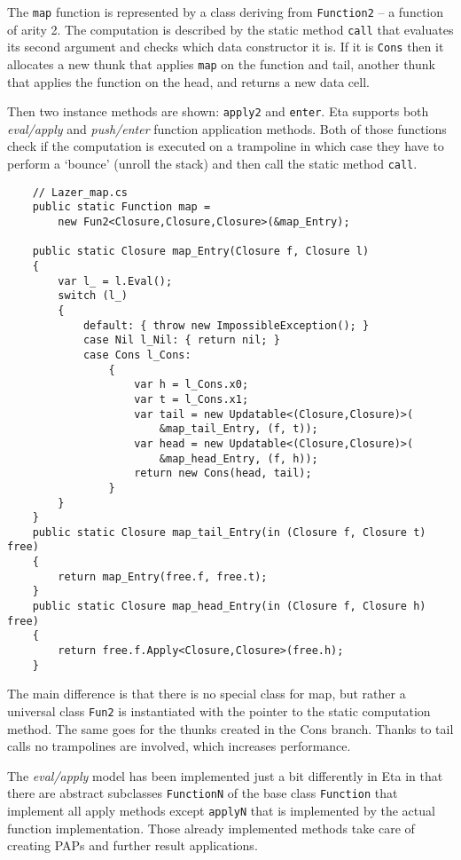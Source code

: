 \documentclass[en]{pracamgr}
\begin{document}
The \texttt{map} function is represented by a class deriving
from \texttt{Function2} -- a function of arity 2.
The computation is described by the static method \texttt{call}
that evaluates its second argument and checks which data
constructor it is. If it is \texttt{Cons} then it
allocates a new thunk that applies \texttt{map} on the function and tail, another thunk that applies the
function on the head, and returns a new data cell.

Then two instance methods are shown: \texttt{apply2} and \texttt{enter}.
Eta supports both \textit{eval/apply} and \textit{push/enter}
function application methods.
Both of those functions check if the computation is
executed on a trampoline in which case they have to
perform a `bounce' (unroll the stack)
and then call the static method \texttt{call}.

\begin{verbatim}
    // Lazer_map.cs
    public static Function map = 
        new Fun2<Closure,Closure,Closure>(&map_Entry);

    public static Closure map_Entry(Closure f, Closure l)
    {
        var l_ = l.Eval();
        switch (l_)
        {
            default: { throw new ImpossibleException(); }
            case Nil l_Nil: { return nil; }
            case Cons l_Cons:
                {
                    var h = l_Cons.x0;
                    var t = l_Cons.x1;
                    var tail = new Updatable<(Closure,Closure)>(
                        &map_tail_Entry, (f, t));
                    var head = new Updatable<(Closure,Closure)>(
                        &map_head_Entry, (f, h));
                    return new Cons(head, tail);
                }
        }
    }
    public static Closure map_tail_Entry(in (Closure f, Closure t) free)
    {
        return map_Entry(free.f, free.t);
    }
    public static Closure map_head_Entry(in (Closure f, Closure h) free)
    {
        return free.f.Apply<Closure,Closure>(free.h);
    }
\end{verbatim}

The main difference is that there is no special class for map,
but rather a universal class \texttt{Fun2} is instantiated
with the pointer to the static computation method.
The same goes for the thunks created in the Cons branch.
Thanks to tail calls no trampolines are involved, which
increases performance.

The \textit{eval/apply} model has been implemented just a bit differently
in Eta in that there are abstract subclasses \texttt{FunctionN}
of the base class \texttt{Function} that implement all
apply methods except \texttt{applyN} that is implemented
by the actual function implementation.
Those already implemented methods take care of creating
PAPs and further result applications.
\end{document}
